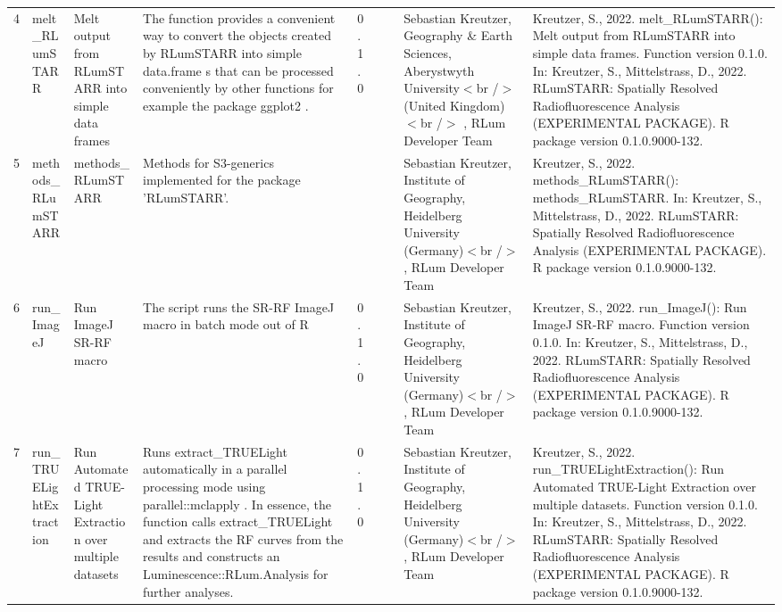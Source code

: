\begin{table}[ht]
\begin{tabular}{rllllllll}
 \\ 
  4 & melt\_RLumSTARR & Melt output from RLumSTARR into simple data frames & The function provides a convenient way to convert the objects created by RLumSTARR into simple  data.frame s that can be processed conveniently by other functions for example the package  ggplot2 . & 0.1.0
 &  &  & Sebastian Kreutzer, Geography \& Earth Sciences, Aberystwyth University$<$br /$>$ (United Kingdom)$<$br /$>$ , RLum Developer Team & Kreutzer, S., 2022. melt\_RLumSTARR(): Melt output from RLumSTARR into simple data frames. Function version 0.1.0. In: Kreutzer, S., Mittelstrass, D., 2022. RLumSTARR: Spatially Resolved Radiofluorescence Analysis (EXPERIMENTAL PACKAGE). R package version 0.1.0.9000-132. 
 \\ 
  5 & methods\_RLumSTARR & methods\_RLumSTARR & Methods for S3-generics implemented for the package 'RLumSTARR'. &  &  &  & Sebastian Kreutzer, Institute of Geography, Heidelberg University (Germany)$<$br /$>$ , RLum Developer Team & Kreutzer, S., 2022. methods\_RLumSTARR(): methods\_RLumSTARR. In: Kreutzer, S., Mittelstrass, D., 2022. RLumSTARR: Spatially Resolved Radiofluorescence Analysis (EXPERIMENTAL PACKAGE). R package version 0.1.0.9000-132. 
 \\ 
  6 & run\_ImageJ & Run ImageJ SR-RF macro & The script runs the SR-RF ImageJ macro in batch mode out of R & 0.1.0
 &  &  & Sebastian Kreutzer, Institute of Geography, Heidelberg University (Germany)$<$br /$>$ , RLum Developer Team & Kreutzer, S., 2022. run\_ImageJ(): Run ImageJ SR-RF macro. Function version 0.1.0. In: Kreutzer, S., Mittelstrass, D., 2022. RLumSTARR: Spatially Resolved Radiofluorescence Analysis (EXPERIMENTAL PACKAGE). R package version 0.1.0.9000-132. 
 \\ 
  7 & run\_TRUELightExtraction & Run Automated TRUE-Light Extraction over multiple datasets & Runs  extract\_TRUELight  automatically in a parallel processing mode using  parallel::mclapply . In essence, the function calls  extract\_TRUELight  and extracts the RF curves from the results and constructs an  Luminescence::RLum.Analysis  for further analyses. & 0.1.0
 &  &  & Sebastian Kreutzer, Institute of Geography, Heidelberg University (Germany)$<$br /$>$ , RLum Developer Team & Kreutzer, S., 2022. run\_TRUELightExtraction(): Run Automated TRUE-Light Extraction over multiple datasets. Function version 0.1.0. In: Kreutzer, S., Mittelstrass, D., 2022. RLumSTARR: Spatially Resolved Radiofluorescence Analysis (EXPERIMENTAL PACKAGE). R package version 0.1.0.9000-132. 
 \\ 
   \hline
\end{tabular}
\end{table}

